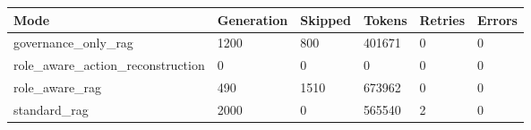 \begin{tabular}{llllll}
\hline
Mode & Generation & Skipped & Tokens & Retries & Errors \\
\hline
governance\_only\_rag & 1200 & 800 & 401671 & 0 & 0 \\
role\_aware\_action\_reconstruction & 0 & 0 & 0 & 0 & 0 \\
role\_aware\_rag & 490 & 1510 & 673962 & 0 & 0 \\
standard\_rag & 2000 & 0 & 565540 & 2 & 0 \\
\hline
\end{tabular}
